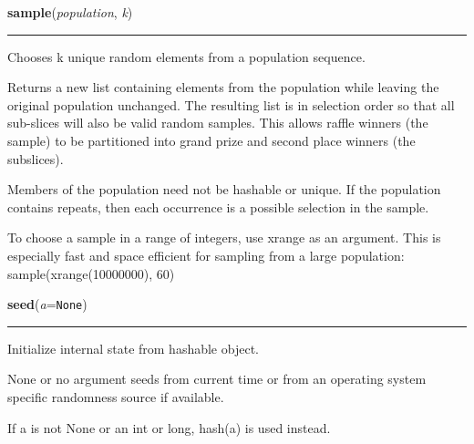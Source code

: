     \label{random:sample}

    \vspace{0.5ex}

\hspace{.8\funcindent}\begin{boxedminipage}{\funcwidth}

    \raggedright \textbf{sample}(\textit{population}, \textit{k})

    \vspace{-1.5ex}

    \rule{\textwidth}{0.5\fboxrule}
\setlength{\parskip}{2ex}
    Chooses k unique random elements from a population sequence.

    Returns a new list containing elements from the population while 
    leaving the original population unchanged.  The resulting list is in 
    selection order so that all sub-slices will also be valid random 
    samples.  This allows raffle winners (the sample) to be partitioned 
    into grand prize and second place winners (the subslices).

    Members of the population need not be hashable or unique.  If the 
    population contains repeats, then each occurrence is a possible 
    selection in the sample.

    To choose a sample in a range of integers, use xrange as an argument. 
    This is especially fast and space efficient for sampling from a large 
    population:   sample(xrange(10000000), 60)

\setlength{\parskip}{1ex}
    \end{boxedminipage}

    \label{random:seed}

    \vspace{0.5ex}

\hspace{.8\funcindent}\begin{boxedminipage}{\funcwidth}

    \raggedright \textbf{seed}(\textit{a}={\tt None})

    \vspace{-1.5ex}

    \rule{\textwidth}{0.5\fboxrule}
\setlength{\parskip}{2ex}
    Initialize internal state from hashable object.

    None or no argument seeds from current time or from an operating system
    specific randomness source if available.

    If a is not None or an int or long, hash(a) is used instead.

\setlength{\parskip}{1ex}
    \end{boxedminipage}

